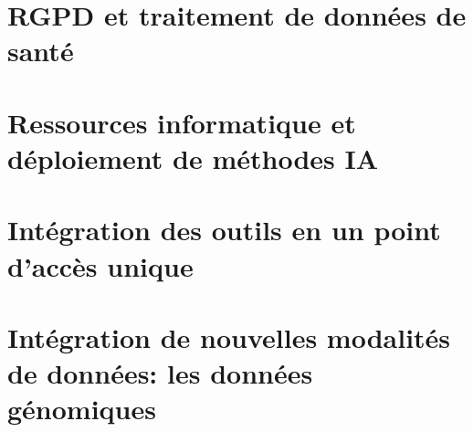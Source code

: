 \section{RGPD et traitement de données de santé}
\section{Ressources informatique et déploiement de méthodes IA}
\section{Intégration des outils en un point d'accès unique}
\section{Intégration de nouvelles modalités de données: les données génomiques}